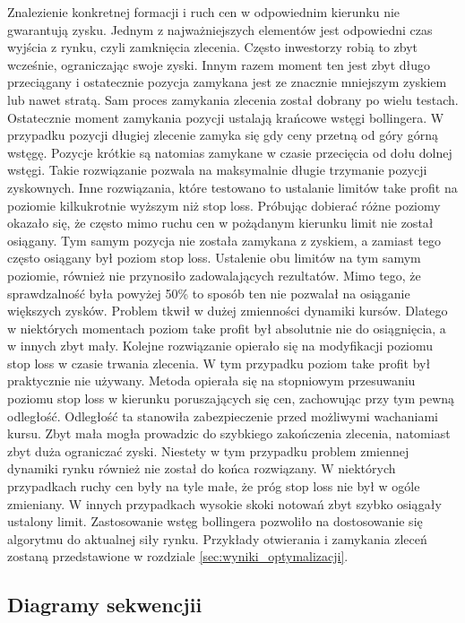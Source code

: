 \documentclass[pdflatex,11pt]{aghdpl}
\begin{document}
Znalezienie konkretnej formacji i ruch cen w odpowiednim kierunku nie gwarantują zysku. Jednym z najważniejszych elementów jest odpowiedni czas wyjścia z rynku, czyli zamknięcia zlecenia. Często inwestorzy robią to zbyt wcześnie, ograniczając swoje zyski. Innym razem moment ten jest zbyt długo przeciągany i ostatecznie pozycja zamykana jest ze znacznie mniejszym zyskiem lub nawet stratą. Sam proces zamykania zlecenia został dobrany po wielu testach. Ostatecznie moment zamykania pozycji ustalają krańcowe wstęgi bollingera. W przypadku pozycji długiej zlecenie zamyka się gdy ceny przetną od góry górną wstęgę. Pozycje krótkie są natomias zamykane w czasie przecięcia od dołu dolnej wstęgi. Takie rozwiązanie pozwala na maksymalnie długie trzymanie pozycji zyskownych. Inne rozwiązania, które testowano to ustalanie limitów take profit na poziomie kilkukrotnie wyższym niż stop loss. Próbując dobierać różne poziomy okazało się, że często mimo ruchu cen w pożądanym kierunku limit nie został osiągany. Tym samym pozycja nie została zamykana z zyskiem, a zamiast tego często osiągany był poziom stop loss. Ustalenie obu limitów na tym samym poziomie, również nie przynosiło zadowalających rezultatów. Mimo tego, że sprawdzalność była powyżej 50\% to sposób ten nie pozwalał na osiąganie większych zysków. Problem tkwił w dużej zmienności dynamiki kursów. Dlatego w niektórych momentach poziom take profit był absolutnie nie do osiągnięcia, a w innych zbyt mały. Kolejne rozwiązanie opierało się na modyfikacji poziomu stop loss w czasie trwania zlecenia. W tym przypadku poziom take profit był praktycznie nie używany. Metoda opierała się na stopniowym przesuwaniu poziomu stop loss w kierunku poruszających się cen, zachowując przy tym pewną odległość. Odległość ta stanowiła zabezpieczenie przed możliwymi wachaniami kursu. Zbyt mała mogła prowadzic do szybkiego zakończenia zlecenia, natomiast zbyt duża ograniczać zyski. Niestety w tym przypadku problem zmiennej dynamiki rynku również nie został do końca rozwiązany. W niektórych przypadkach ruchy cen były na tyle małe, że próg stop loss nie był w ogóle zmieniany. W innych przypadkach wysokie skoki notowań zbyt szybko osiągały ustalony limit. Zastosowanie wstęg bollingera pozwoliło na dostosowanie się algorytmu do aktualnej siły rynku. Przykłady otwierania i zamykania zleceń zostaną przedstawione w rozdziale \ref{sec:wyniki_optymalizacji}.
\subsection{Diagramy sekwencjii}
\paragraph{}
\end{document}
